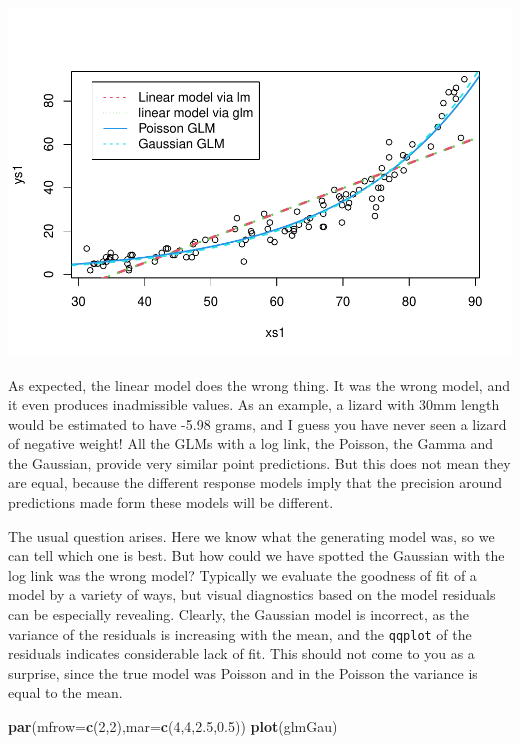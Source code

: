 \documentclass[
]{book}
\newenvironment{Shaded}{\begin{snugshade}}{\end{snugshade}}
\newcommand{\AttributeTok}[1]{\textcolor[rgb]{0.13,0.29,0.53}{#1}}
\newcommand{\DecValTok}[1]{\textcolor[rgb]{0.00,0.00,0.81}{#1}}
\newcommand{\FloatTok}[1]{\textcolor[rgb]{0.00,0.00,0.81}{#1}}
\newcommand{\FunctionTok}[1]{\textcolor[rgb]{0.13,0.29,0.53}{\textbf{#1}}}
\newcommand{\NormalTok}[1]{#1}
\begin{document}
\begin{Shaded}
\begin{Highlighting}[]
\end{Highlighting}
\end{Shaded}

\includegraphics{ECOMODbook_files/figure-latex/glm4-1.pdf}

As expected, the linear model does the wrong thing. It was the wrong model, and it even produces inadmissible values. As an example, a lizard with 30mm length would be estimated to have -5.98 grams, and I guess you have never seen a lizard of negative weight! All the GLMs with a log link, the Poisson, the Gamma and the Gaussian, provide very similar point predictions. But this does not mean they are equal, because the different response models imply that the precision around predictions made form these models will be different.

The usual question arises. Here we know what the generating model was, so we can tell which one is best. But how could we have spotted the Gaussian with the log link was the wrong model? Typically we evaluate the goodness of fit of a model by a variety of ways, but visual diagnostics based on the model residuals can be especially revealing. Clearly, the Gaussian model is incorrect, as the variance of the residuals is increasing with the mean, and the \texttt{qqplot} of the residuals indicates considerable lack of fit. This should not come to you as a surprise, since the true model was Poisson and in the Poisson the variance is equal to the mean.

\begin{Shaded}
\begin{Highlighting}[]
\FunctionTok{par}\NormalTok{(}\AttributeTok{mfrow=}\FunctionTok{c}\NormalTok{(}\DecValTok{2}\NormalTok{,}\DecValTok{2}\NormalTok{),}\AttributeTok{mar=}\FunctionTok{c}\NormalTok{(}\DecValTok{4}\NormalTok{,}\DecValTok{4}\NormalTok{,}\FloatTok{2.5}\NormalTok{,}\FloatTok{0.5}\NormalTok{))}
\FunctionTok{plot}\NormalTok{(glmGau)}
\end{Highlighting}
\end{Shaded}
\end{document}
